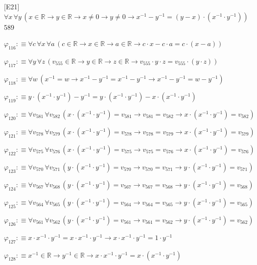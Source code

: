 \begin{fullproof}{[E21]}{$\forall x\,\forall y\,(x \in \mathbb{R} \to y \in \mathbb{R} \to x \neq 0 \to y \neq 0 \to x^{-1} - y^{-1} = (y - x) \cdot (x^{-1} \cdot y^{-1}))$}{589}
\begin{abbrevlist}
\item $\varphi_{116} :\equiv \forall c\,\forall x\,\forall a\,(c \in \mathbb{R} \to x \in \mathbb{R} \to a \in \mathbb{R} \to c \cdot x - c \cdot a = c \cdot (x - a))$
\item $\varphi_{117} :\equiv \forall y\,\forall z\,(v_{555} \in \mathbb{R} \to y \in \mathbb{R} \to z \in \mathbb{R} \to v_{555} \cdot y \cdot z = v_{555} \cdot (y \cdot z))$
\item $\varphi_{118} :\equiv \forall w\,(x^{-1} = w \to x^{-1} - y^{-1} = x^{-1} - y^{-1} \to x^{-1} - y^{-1} = w - y^{-1})$
\item $\varphi_{119} :\equiv y \cdot (x^{-1} \cdot y^{-1}) - y^{-1} = y \cdot (x^{-1} \cdot y^{-1}) - x \cdot (x^{-1} \cdot y^{-1})$
\item $\varphi_{120} :\equiv \forall v_{581}\,\forall v_{582}\,(x \cdot (x^{-1} \cdot y^{-1}) = v_{581} \to v_{581} = v_{582} \to x \cdot (x^{-1} \cdot y^{-1}) = v_{582})$
\item $\varphi_{121} :\equiv \forall v_{578}\,\forall v_{579}\,(x \cdot (x^{-1} \cdot y^{-1}) = v_{578} \to v_{578} = v_{579} \to x \cdot (x^{-1} \cdot y^{-1}) = v_{579})$
\item $\varphi_{122} :\equiv \forall v_{575}\,\forall v_{576}\,(x \cdot (x^{-1} \cdot y^{-1}) = v_{575} \to v_{575} = v_{576} \to x \cdot (x^{-1} \cdot y^{-1}) = v_{576})$
\item $\varphi_{123} :\equiv \forall v_{570}\,\forall v_{571}\,(y \cdot (x^{-1} \cdot y^{-1}) = v_{570} \to v_{570} = v_{571} \to y \cdot (x^{-1} \cdot y^{-1}) = v_{571})$
\item $\varphi_{124} :\equiv \forall v_{567}\,\forall v_{568}\,(y \cdot (x^{-1} \cdot y^{-1}) = v_{567} \to v_{567} = v_{568} \to y \cdot (x^{-1} \cdot y^{-1}) = v_{568})$
\item $\varphi_{125} :\equiv \forall v_{564}\,\forall v_{565}\,(y \cdot (x^{-1} \cdot y^{-1}) = v_{564} \to v_{564} = v_{565} \to y \cdot (x^{-1} \cdot y^{-1}) = v_{565})$
\item $\varphi_{126} :\equiv \forall v_{561}\,\forall v_{562}\,(y \cdot (x^{-1} \cdot y^{-1}) = v_{561} \to v_{561} = v_{562} \to y \cdot (x^{-1} \cdot y^{-1}) = v_{562})$
\item $\varphi_{127} :\equiv x \cdot x^{-1} \cdot y^{-1} = x \cdot x^{-1} \cdot y^{-1} \to x \cdot x^{-1} \cdot y^{-1} = 1 \cdot y^{-1}$
\item $\varphi_{128} :\equiv x^{-1} \in \mathbb{R} \to y^{-1} \in \mathbb{R} \to x \cdot x^{-1} \cdot y^{-1} = x \cdot (x^{-1} \cdot y^{-1})$

\end{abbrevlist}
\end{fullproof}
